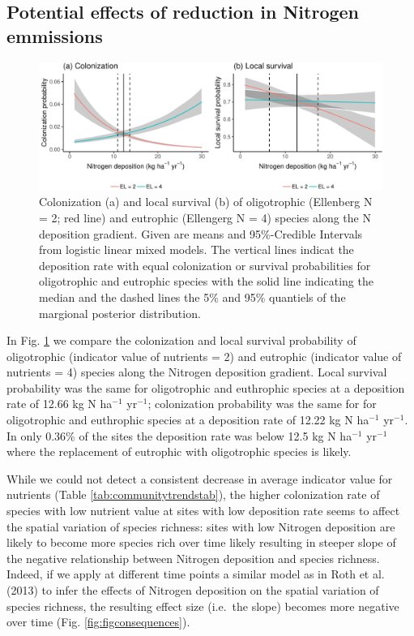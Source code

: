 \documentclass[fleqn,10pt,lineno]{wlpeerj} %
\theoremstyle{definition}
\theoremstyle{definition}
\theoremstyle{definition}
\theoremstyle{remark}
\begin{document}
\subsection*{Potential effects of reduction in Nitrogen
emmissions}\label{potential-effects-of-reduction-in-nitrogen-emmissions}

\begin{figure}
\includegraphics[width=1\linewidth]{Manuscript_files/figure-latex/cl-1} \caption{Colonization (a) and local survival (b) of oligotrophic (Ellenberg N = 2; red line) and eutrophic (Ellengerg N = 4) species along the N deposition gradient. Given are means and 95\%-Credible Intervals from logistic linear mixed models. The vertical lines indicat the deposition rate with equal colonization or survival probabilities for oligotrophic and eutrophic species with the solid line indicating the median and the dashed lines the 5\% and 95\% quantiels of the margional posterior distribution.}\label{fig:cl}
\end{figure}

In Fig. \ref{fig:cl} we compare the colonization and local survival
probability of oligotrophic (indicator value of nutrients = 2) and
eutrophic (indicator value of nutrients = 4) species along the Nitrogen
deposition gradient. Local survival probability was the same for
oligotrophic and euthrophic species at a deposition rate of 12.66 kg N
ha\(^{-1}\) yr\(^{-1}\); colonization probability was the same for for
oligotrophic and euthrophic species at a deposition rate of 12.22 kg N
ha\(^{-1}\) yr\(^{-1}\). In only 0.36\% of the sites the deposition rate
was below 12.5 kg N ha\(^{-1}\) yr\(^{-1}\) where the replacement of
eutrophic with oligotrophic species is likely.

While we could not detect a consistent decrease in average indicator
value for nutrients (Table \ref{tab:communitytrendstab}), the higher
colonization rate of species with low nutrient value at sites with low
deposition rate seems to affect the spatial variation of species
richness: sites with low Nitrogen deposition are likely to become more
species rich over time likely resulting in steeper slope of the negative
relationship between Nitrogen deposition and species richness. Indeed,
if we apply at different time points a similar model as in Roth et al.
(2013) to infer the effects of Nitrogen deposition on the spatial
variation of species richness, the resulting effect size (i.e.~the
slope) becomes more negative over time (Fig. \ref{fig:figconsequences}).
\end{document}
